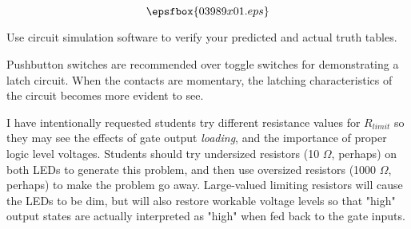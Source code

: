 

$$\epsfbox{03989x01.eps}$$

\vfil \eject






Use circuit simulation software to verify your predicted and actual truth tables.







Pushbutton switches are recommended over toggle switches for demonstrating a latch circuit.  When the contacts are momentary, the latching characteristics of the circuit becomes more evident to see.

I have intentionally requested students try different resistance values for $R_{limit}$ so they may see the effects of gate output {\it loading}, and the importance of proper logic level voltages.  Students should try undersized resistors (10 $\Omega$, perhaps) on both LEDs to generate this problem, and then use oversized resistors (1000 $\Omega$, perhaps) to make the problem go away.  Large-valued limiting resistors will cause the LEDs to be dim, but will also restore workable voltage levels so that "high" output states are actually interpreted as "high" when fed back to the gate inputs.




